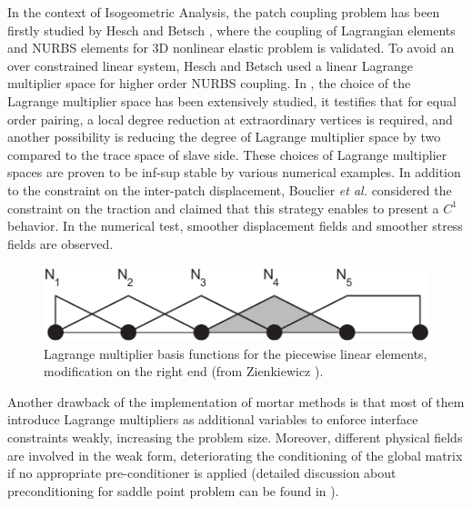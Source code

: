 \documentclass[preprint,12pt]{elsarticle}
\theoremstyle{remark}
\begin{document}
In the context of Isogeometric Analysis, the patch coupling problem has been firstly studied by Hesch and Betsch \cite{hesch_isogeometric_2012}, where the coupling of Lagrangian elements and NURBS elements for 3D nonlinear elastic problem is validated. To avoid an over constrained linear system, Hesch and Betsch used a linear Lagrange multiplier space for higher order NURBS coupling. In \cite{brivadis_isogeometric_2015}, the choice of the Lagrange multiplier space has been extensively studied, it testifies that for equal order pairing, a local degree reduction at extraordinary vertices is required, and another possibility is reducing the degree of Lagrange multiplier space  by two compared to the trace space of slave side. These choices of Lagrange multiplier spaces are proven to be inf-sup stable by various numerical examples. In addition to the constraint on the inter-patch displacement, Bouclier \textit{et al.} \cite{bouclier_development_2017} considered the constraint on the traction and claimed that this strategy enables to present a $C^1$ behavior. In the numerical test, smoother displacement fields and smoother stress fields are observed. \par
\begin{figure}
    \centering
    \includegraphics[width=.7\linewidth]{mortar_basis}
    \caption{Lagrange multiplier basis functions for the piecewise linear elements, modification on the right end (from Zienkiewicz \cite{zienkiewicz1977finite}).}\label{fig:mortar_basis}
\end{figure}
Another drawback of the implementation of mortar methods is that most of them introduce Lagrange multipliers as additional variables to enforce interface constraints weakly, increasing the problem size. Moreover, different physical fields are involved in the weak form, deteriorating the conditioning of the global matrix if no appropriate pre-conditioner is applied (detailed discussion about preconditioning for saddle point problem can be found in \cite{farhat_scalable_1995,benzi_preconditioning_2008,tezaur_analysis_1998}).\par
\end{document}
